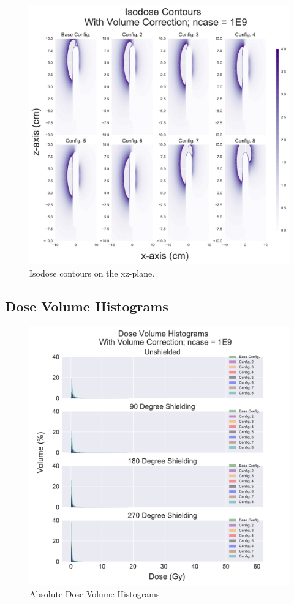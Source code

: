 \documentclass[12pt]{article}
\begin{document}
\begin{figure}[!ht]
	\centering
	\includegraphics[scale=0.6]{xz_isodose_profiles_270Shield}
	\caption{Isodose contours on the xz-plane.}
\end{figure}

\FloatBarrier

\subsection{Dose Volume Histograms}

\begin{figure}[!ht]
	\centering
	\includegraphics[scale=0.6]{dose_volume_histogram}
	\caption{Absolute Dose Volume Histograms}
\end{figure}
\end{document}
